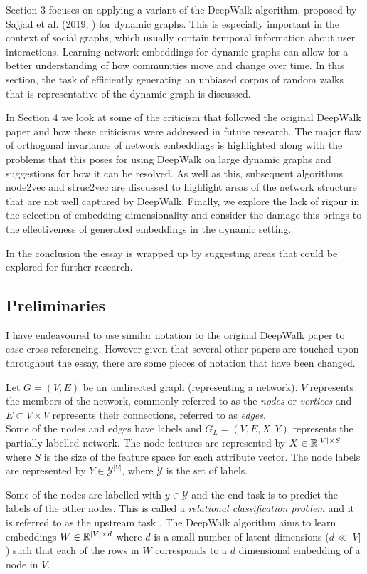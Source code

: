\documentclass[a4paper]{article}
\begin{document}
Section 3 focuses on applying a variant of the DeepWalk algorithm, proposed
by Sajjad et al. (2019, \cite{sajjad2019}) for dynamic graphs. This is especially
important in the context of social graphs, which usually contain temporal information
about user interactions. Learning network embeddings for dynamic graphs can allow for a better understanding of how
communities move and change over time. In this section, the task of efficiently generating an unbiased corpus of random walks that is representative of
the dynamic graph is discussed.

In Section 4 we look at some of the criticism that followed the original DeepWalk paper and how these criticisms
were addressed in future research. The major flaw of orthogonal invariance of network embeddings is highlighted along with the problems that this poses for using DeepWalk on large dynamic graphs and suggestions for how it can be resolved.
As well as this, subsequent algorithms node2vec and struc2vec are discussed to highlight areas of the network structure that are not well captured by DeepWalk. Finally, we explore the lack of rigour in the selection of embedding dimensionality and consider the damage this brings to the effectiveness of generated embeddings in the dynamic setting.

In the conclusion the essay is wrapped up by suggesting areas that could be explored for further research.

\subsection{Preliminaries}
I have endeavoured to use similar notation to the original DeepWalk paper to ease
cross-referencing. However given that several other papers are touched upon
throughout the essay, there are some pieces of notation that have been changed.

\begin{definition}
  Let $G = (V, E)$ be an undirected graph (representing a network). $V$ represents the
  members of the network, commonly referred to as the \textit{nodes} or \textit{vertices} and $E \subset V
  \times V$ represents their connections, referred to as
  \textit{edges}.\\
  Some of the nodes and edges have labels and $G_L = (V, E, X, Y)$ represents the
  partially labelled network. The node features are represented by $X \in \R^{|V| \times S}$ where $S$ is the size of
  the feature space for each attribute vector. The node labels are represented by $Y \in \mathcal{Y}^{|V|}$, where $\mathcal{Y}$ is the set of labels.
\end{definition}
Some of the nodes are labelled with $y \in \mathcal{Y}$ and the end task is to
predict the labels of the other nodes. This is called a \textit{relational classification problem} and it is referred to as the upstream task \cite{deepwalk}. The DeepWalk algorithm aims to learn embeddings $W \in \R^{|V| \times d}$ where $d$ is a small number
of latent dimensions ($d \ll |V|$) such that each of the rows in $W$
corresponds to a $d$ dimensional embedding of a node in $V$.
\end{document}
